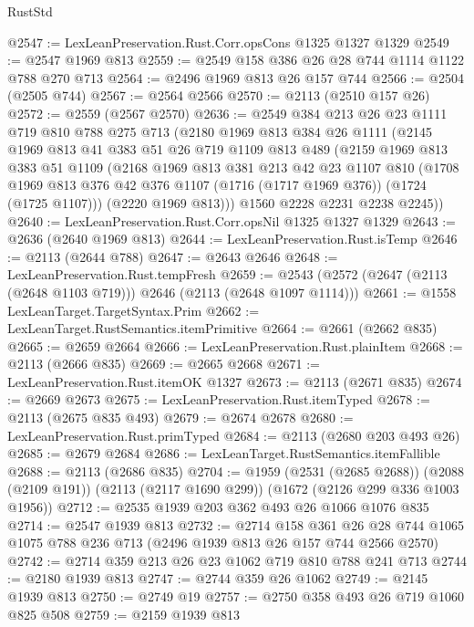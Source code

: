 \begin{lexlean}{RustStd}
\begin{coremodule}
@2547 := LexLeanPreservation.Rust.Corr.opsCons @1325 @1327 @1329
@2549 := @2547 @1969 @813
@2559 := @2549 @158 @386 @26 @28 @744 @1114 @1122 @788 @270 @713
@2564 := @2496 @1969 @813 @26 @157 @744
@2566 := @2504 (@2505 @744)
@2567 := @2564 @2566
@2570 := @2113 (@2510 @157 @26)
@2572 := @2559 (@2567 @2570)
@2636 := @2549
    @384
    @213
    @26
    @23
    @1111
    @719
    @810
    @788
    @275
    @713
    (@2180
      @1969
      @813
      @384
      @26
      @1111
      (@2145
        @1969
        @813
        @41
        @383
        @51
        @26
        @719
        @1109
        @813
        @489
        (@2159
          @1969
          @813
          @383
          @51
          @1109
          (@2168
            @1969
            @813
            @381
            @213
            @42
            @23
            @1107
            @810
            (@1708 @1969 @813 @376 @42 @376 @1107 (@1716 (@1717 @1969 @376)) (@1724 (@1725 @1107)))
            (@2220 @1969 @813)))
        @1560
        @2228
        @2231
        @2238
        @2245))
@2640 := LexLeanPreservation.Rust.Corr.opsNil @1325 @1327 @1329
@2643 := @2636 (@2640 @1969 @813)
@2644 := LexLeanPreservation.Rust.isTemp
@2646 := @2113 (@2644 @788)
@2647 := @2643 @2646
@2648 := LexLeanPreservation.Rust.tempFresh
@2659 := @2543 (@2572 (@2647 (@2113 (@2648 @1103 @719))) @2646 (@2113 (@2648 @1097 @1114)))
@2661 := @1558 LexLeanTarget.TargetSyntax.Prim
@2662 := LexLeanTarget.RustSemantics.itemPrimitive
@2664 := @2661 (@2662 @835)
@2665 := @2659 @2664
@2666 := LexLeanPreservation.Rust.plainItem
@2668 := @2113 (@2666 @835)
@2669 := @2665 @2668
@2671 := LexLeanPreservation.Rust.itemOK @1327
@2673 := @2113 (@2671 @835)
@2674 := @2669 @2673
@2675 := LexLeanPreservation.Rust.itemTyped
@2678 := @2113 (@2675 @835 @493)
@2679 := @2674 @2678
@2680 := LexLeanPreservation.Rust.primTyped
@2684 := @2113 (@2680 @203 @493 @26)
@2685 := @2679 @2684
@2686 := LexLeanTarget.RustSemantics.itemFallible
@2688 := @2113 (@2686 @835)
@2704 := @1959
    (@2531 (@2685 @2688))
    (@2088 (@2109 @191))
    (@2113 (@2117 @1690 @299))
    (@1672 (@2126 @299 @336 @1003 @1956))
@2712 := @2535 @1939 @203 @362 @493 @26 @1066 @1076 @835
@2714 := @2547 @1939 @813
@2732 := @2714
    @158
    @361
    @26
    @28
    @744
    @1065
    @1075
    @788
    @236
    @713
    (@2496 @1939 @813 @26 @157 @744 @2566 @2570)
@2742 := @2714 @359 @213 @26 @23 @1062 @719 @810 @788 @241 @713
@2744 := @2180 @1939 @813
@2747 := @2744 @359 @26 @1062
@2749 := @2145 @1939 @813
@2750 := @2749 @19
@2757 := @2750 @358 @493 @26 @719 @1060 @825 @508
@2759 := @2159 @1939 @813

\end{coremodule}
\end{lexlean}
